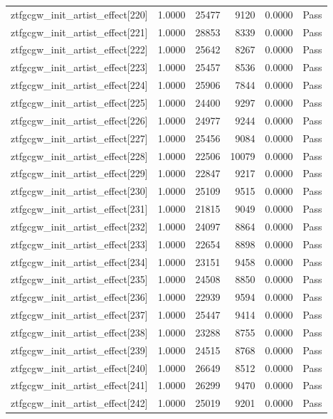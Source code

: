 \begin{table}[htbp]
\begin{tabular}{llrrll}
ztfgcgw\_init\_artist\_effect[220] & 1.0000 & 25477 & 9120 & 0.0000 & Pass \\
ztfgcgw\_init\_artist\_effect[221] & 1.0000 & 28853 & 8339 & 0.0000 & Pass \\
ztfgcgw\_init\_artist\_effect[222] & 1.0000 & 25642 & 8267 & 0.0000 & Pass \\
ztfgcgw\_init\_artist\_effect[223] & 1.0000 & 25457 & 8536 & 0.0000 & Pass \\
ztfgcgw\_init\_artist\_effect[224] & 1.0000 & 25906 & 7844 & 0.0000 & Pass \\
ztfgcgw\_init\_artist\_effect[225] & 1.0000 & 24400 & 9297 & 0.0000 & Pass \\
ztfgcgw\_init\_artist\_effect[226] & 1.0000 & 24977 & 9244 & 0.0000 & Pass \\
ztfgcgw\_init\_artist\_effect[227] & 1.0000 & 25456 & 9084 & 0.0000 & Pass \\
ztfgcgw\_init\_artist\_effect[228] & 1.0000 & 22506 & 10079 & 0.0000 & Pass \\
ztfgcgw\_init\_artist\_effect[229] & 1.0000 & 22847 & 9217 & 0.0000 & Pass \\
ztfgcgw\_init\_artist\_effect[230] & 1.0000 & 25109 & 9515 & 0.0000 & Pass \\
ztfgcgw\_init\_artist\_effect[231] & 1.0000 & 21815 & 9049 & 0.0000 & Pass \\
ztfgcgw\_init\_artist\_effect[232] & 1.0000 & 24097 & 8864 & 0.0000 & Pass \\
ztfgcgw\_init\_artist\_effect[233] & 1.0000 & 22654 & 8898 & 0.0000 & Pass \\
ztfgcgw\_init\_artist\_effect[234] & 1.0000 & 23151 & 9458 & 0.0000 & Pass \\
ztfgcgw\_init\_artist\_effect[235] & 1.0000 & 24508 & 8850 & 0.0000 & Pass \\
ztfgcgw\_init\_artist\_effect[236] & 1.0000 & 22939 & 9594 & 0.0000 & Pass \\
ztfgcgw\_init\_artist\_effect[237] & 1.0000 & 25447 & 9414 & 0.0000 & Pass \\
ztfgcgw\_init\_artist\_effect[238] & 1.0000 & 23288 & 8755 & 0.0000 & Pass \\
ztfgcgw\_init\_artist\_effect[239] & 1.0000 & 24515 & 8768 & 0.0000 & Pass \\
ztfgcgw\_init\_artist\_effect[240] & 1.0000 & 26649 & 8512 & 0.0000 & Pass \\
ztfgcgw\_init\_artist\_effect[241] & 1.0000 & 26299 & 9470 & 0.0000 & Pass \\
ztfgcgw\_init\_artist\_effect[242] & 1.0000 & 25019 & 9201 & 0.0000 & Pass \\

\end{tabular}
\end{table}
